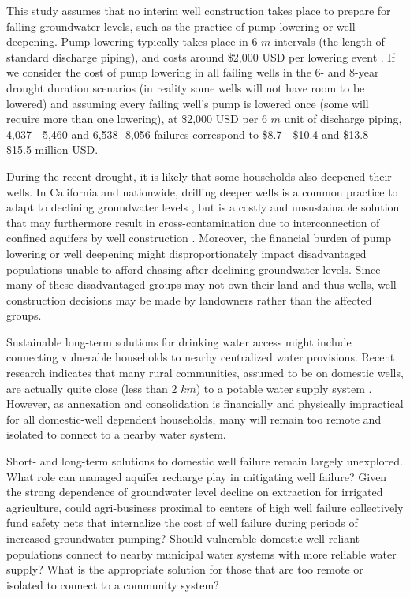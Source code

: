 This study assumes that no interim well construction takes place to prepare for falling groundwater levels, such as the practice of pump lowering or well deepening. Pump lowering typically takes place in 6 $m$ intervals (the length of standard discharge piping), and costs around \$2,000 USD per lowering event \citep{Gailey2019}. If we consider the cost of pump lowering in all failing wells in the 6- and 8-year drought duration scenarios (in reality some wells will not have room to be lowered) and assuming every failing well's pump is lowered once (some will require more than one lowering), at \$2,000 USD per 6 $m$ unit of discharge piping, 4,037 - 5,460 and 6,538- 8,056 failures correspond to \$8.7 - \$10.4 and \$13.8 - \$15.5 million USD. 

During the recent drought, it is likely that some households also deepened their wells. In California and nationwide, drilling deeper wells is a common practice to adapt to declining groundwater levels \citep{Perrone2019}, but is a costly and unsustainable solution that may furthermore result in cross-contamination due to interconnection of confined aquifers by well construction \citep{gailey2017inactive}. Moreover, the financial burden of pump lowering or well deepening might disproportionately impact disadvantaged populations \citep{Famiglietti2014} unable to afford chasing after declining groundwater levels. Since many of these disadvantaged groups may not own their land and thus wells, well construction decisions may be made by landowners rather than the affected groups.  

Sustainable long-term solutions for drinking water access might include connecting vulnerable households to nearby centralized water provisions. Recent research indicates that many rural communities, assumed to be on domestic wells, are actually quite close (less than 2 $km$) to a potable water supply system \citep{London2018}. However, as annexation and consolidation is financially and physically impractical for all domestic-well dependent households, many will remain too remote and isolated to connect to a nearby water system.  

Short- and long-term solutions to domestic well failure remain largely unexplored. What role can managed aquifer recharge play in mitigating well failure? Given the strong dependence of groundwater level decline on extraction for irrigated agriculture, could agri-business proximal to centers of high well failure collectively fund safety nets that internalize the cost of well failure during periods of increased groundwater pumping? Should vulnerable domestic well reliant populations connect to nearby municipal water systems with more reliable water supply? What is the appropriate solution for those that are too remote or isolated to connect to a community system? 

